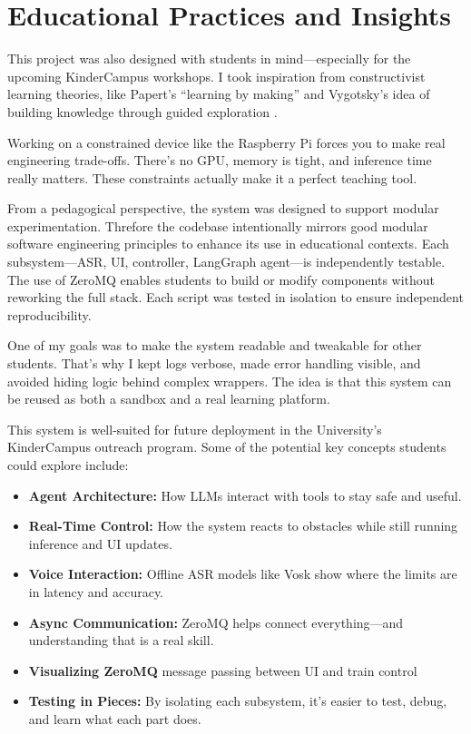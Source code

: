 \section{Educational Practices and Insights}

This project was also designed with students in mind—especially for the upcoming KinderCampus workshops. I took inspiration from constructivist learning theories, like Papert’s “learning by making” and Vygotsky’s idea of building knowledge through guided exploration \cite{papert1980mindstorms}.

Working on a constrained device like the Raspberry Pi forces you to make real engineering trade-offs. There's no GPU, memory is tight, and inference time really matters. These constraints actually make it a perfect teaching tool.

From a pedagogical perspective, the system was designed to support modular experimentation. Threfore the codebase intentionally mirrors good modular software engineering principles to enhance its use in educational contexts. Each subsystem—ASR, UI, controller, LangGraph agent—is independently testable. 
The use of ZeroMQ enables students to build or modify components without reworking the full stack. Each script was tested in isolation to ensure independent reproducibility. 

One of my goals was to make the system readable and tweakable for other students. That’s why I kept logs verbose, made error handling visible, and avoided hiding logic behind complex wrappers. The idea is that this system can be reused as both a sandbox and a real learning platform.

This system is well-suited for future deployment in the University’s KinderCampus outreach program. 
Some of the potential key concepts students could explore include:

\begin{itemize}
    \item \textbf{Agent Architecture:} How LLMs interact with tools to stay safe and useful.
    \item \textbf{Real-Time Control:} How the system reacts to obstacles while still running inference and UI updates.
    \item \textbf{Voice Interaction:} Offline ASR models like Vosk show where the limits are in latency and accuracy.
    \item \textbf{Async Communication:} ZeroMQ helps connect everything—and understanding that is a real skill.
      \item \textbf{Visualizing ZeroMQ} message passing between UI and train control
    \item \textbf{Testing in Pieces:} By isolating each subsystem, it’s easier to test, debug, and learn what each part does.
\end{itemize}

